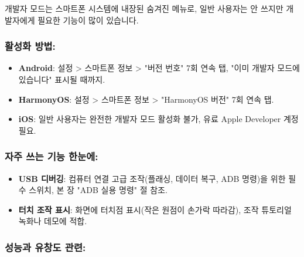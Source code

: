 


개발자 모드는 스마트폰 시스템에 내장된 숨겨진 메뉴로, 일반 사용자는 안 쓰지만 개발자에게 필요한 기능이 많이 있습니다.

\subsubsection*{활성화 방법:}

\begin{itemize}
  \item \textbf{Android}: 설정 > 스마트폰 정보 > "버전 번호" 7회 연속 탭, "이미 개발자 모드에 있습니다" 표시될 때까지.
  \item \textbf{HarmonyOS}: 설정 > 스마트폰 정보 > "HarmonyOS 버전" 7회 연속 탭.
  \item \textbf{iOS}: 일반 사용자는 완전한 개발자 모드 활성화 불가, 유료 Apple Developer 계정 필요.
\end{itemize}

\subsubsection*{자주 쓰는 기능 한눈에:}

\begin{itemize}
  \item \textbf{USB 디버깅}: 컴퓨터 연결 고급 조작(플래싱, 데이터 복구, ADB 명령)을 위한 필수 스위치, 본 장 "ADB 실용 명령" 절 참조.
  \item \textbf{터치 조작 표시}: 화면에 터치점 표시(작은 원점이 손가락 따라감), 조작 튜토리얼 녹화나 데모에 적합.
\end{itemize}

\subsubsection*{성능과 유창도 관련:}

